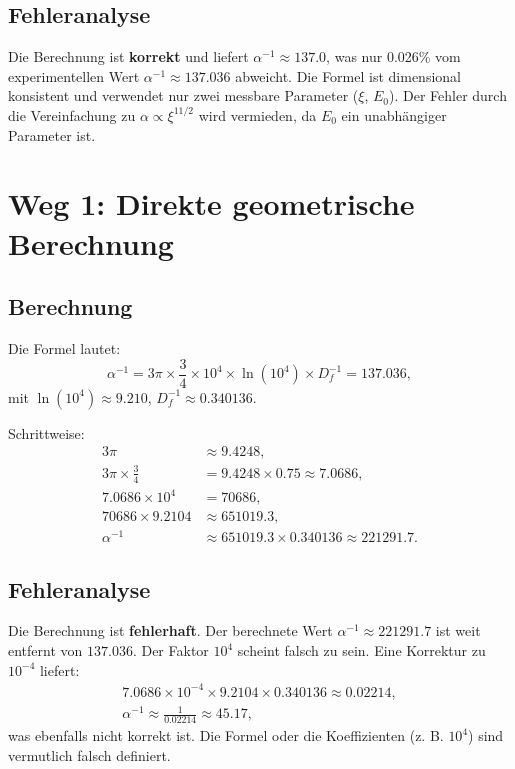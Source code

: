 \documentclass[12pt,a4paper]{article}
\theoremstyle{definition}
\begin{document}
	\subsection{Fehleranalyse}
	\begin{tcolorbox}[colback=green!5!white,colframe=deepgreen,title=Korrektheit]
		Die Berechnung ist \textbf{korrekt} und liefert \(\alpha^{-1} \approx 137.0\), was nur 0.026\% vom experimentellen Wert \(\alpha^{-1} \approx 137.036\) abweicht. Die Formel ist dimensional konsistent und verwendet nur zwei messbare Parameter (\(\xi\), \(E_0\)). Der Fehler durch die Vereinfachung zu \(\alpha \propto \xi^{11/2}\) wird vermieden, da \(E_0\) ein unabhängiger Parameter ist.
	\end{tcolorbox}
	
	\section{Weg 1: Direkte geometrische Berechnung}
	\subsection{Berechnung}
	Die Formel lautet:
	\begin{equation}
		\alpha^{-1} = 3\pi \times \frac{3}{4} \times 10^4 \times \ln(10^4) \times D_f^{-1} = 137.036,
	\end{equation}
	mit \(\ln(10^4) \approx 9.210\), \(D_f^{-1} \approx 0.340136\).
	
	Schrittweise:
	\begin{align}
		3\pi &\approx 9.4248, \\
		3\pi \times \frac{3}{4} &= 9.4248 \times 0.75 \approx 7.0686, \\
		7.0686 \times 10^4 &= 70686, \\
		70686 \times 9.2104 &\approx 651019.3, \\
		\alpha^{-1} &\approx 651019.3 \times 0.340136 \approx 221291.7.
	\end{align}
	
	\subsection{Fehleranalyse}
	\begin{tcolorbox}[colback=red!5!white,colframe=deepred,title=Fehler]
		Die Berechnung ist \textbf{fehlerhaft}. Der berechnete Wert \(\alpha^{-1} \approx 221291.7\) ist weit entfernt von \(137.036\). Der Faktor \(10^4\) scheint falsch zu sein. Eine Korrektur zu \(10^{-4}\) liefert:
		\begin{align*}
			7.0686 \times 10^{-4} \times 9.2104 \times 0.340136 \approx 0.02214, \\
			\alpha^{-1} \approx \frac{1}{0.02214} \approx 45.17,
		\end{align*}
		was ebenfalls nicht korrekt ist. Die Formel oder die Koeffizienten (z. B. \(10^4\)) sind vermutlich falsch definiert.
	\end{tcolorbox}
	
\end{document}
